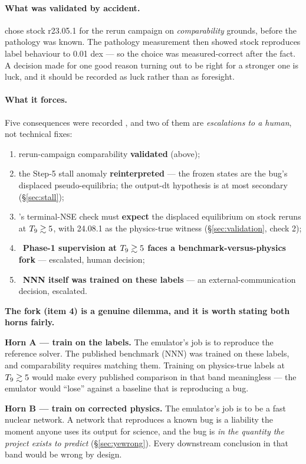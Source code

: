 \paragraph{What was validated by accident.}  chose stock
r23.05.1 for the rerun campaign on \emph{comparability} grounds, before the
pathology was known. The pathology measurement then showed stock reproduces
label behaviour to 0.01 dex --- so the choice was measured-correct after the
fact. A decision made for one good reason turning out to be right for a
stronger one is luck, and it should be recorded as luck rather than as
foresight.

\paragraph{What it forces.} Five consequences were recorded
, and two of them are \emph{escalations to a human}, not
technical fixes:

\begin{enumerate}
\item rerun-campaign comparability \textbf{validated} (above);
\item the Step-5 stall anomaly \textbf{reinterpreted} --- the frozen states are
  the bug's displaced pseudo-equilibria; the output-dt hypothesis is at most
  secondary (\S\ref{sec:stall});
\item {}'s terminal-NSE check must \textbf{expect} the
  displaced equilibrium on stock reruns at $T_{9} \gtrsim 5$, with 24.08.1 as
  the physics-true witness (\S\ref{sec:validation}, check 2);
\item \warnglyph{}~\textbf{Phase-1 supervision at $T_{9} \gtrsim 5$ faces a
  benchmark-versus-physics fork} --- escalated, human decision;
\item \warnglyph{}~\textbf{NNN itself was trained on these labels} --- an
  external-communication decision, escalated.
\end{enumerate}

\textbf{The fork (item 4) is a genuine dilemma, and it is worth stating both
horns fairly.}

\begin{aside}
\textbf{Horn A --- train on the labels.} The emulator's job is to reproduce
the reference solver. The published benchmark (NNN) was trained on these
labels, and comparability requires matching them. Training on physics-true
labels at $T_{9} \gtrsim 5$ would make every published comparison in that band
meaningless --- the emulator would ``lose'' against a baseline that is
reproducing a bug.

\textbf{Horn B --- train on corrected physics.} The emulator's job is to be a
fast nuclear network. A network that reproduces a known bug is a liability the
moment anyone uses its output for science, and the bug is \emph{in the quantity
the project exists to predict} (\S\ref{sec:yewrong}). Every downstream \Ye{}
conclusion in that band would be wrong by design.
\end{aside}

